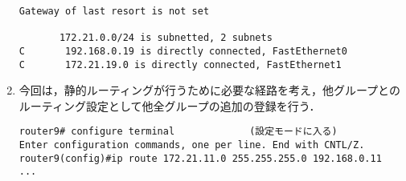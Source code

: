 \documentclass[a4j,titlepage]{jarticle}
\begin{document}
\begin{enumerate}
\begin{center}
\begin{screen}
\begin{verbatim}
Gateway of last resort is not set

       172.21.0.0/24 is subnetted, 2 subnets
C       192.168.0.19 is directly connected, FastEthernet0
C       172.21.19.0 is directly connected, FastEthernet1
\end{verbatim}
    \end{screen}
  \end{center}
  
\item 今回は，静的ルーティングが行うために必要な経路を考え，他グループとのルーティング設定として他全グループの追加の登録を行う．
\begin{center}
\begin{screen}
\begin{verbatim}
router9# configure terminal             (設定モードに入る)
Enter configuration commands, one per line. End with CNTL/Z.
router9(config)#ip route 172.21.11.0 255.255.255.0 192.168.0.11
...
\end{verbatim}
\end{screen}
\end{center}
\end{enumerate}
\end{document}
